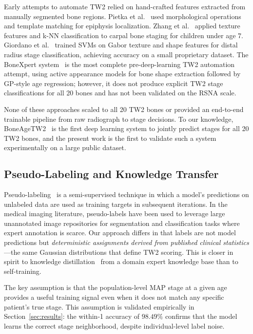 \documentclass[journal]{IEEEtran}
\begin{document}
Early attempts to automate TW2 relied on hand-crafted features
extracted from manually segmented bone regions.
Pietka et al.~\cite{pietka2001} used morphological operations and
template matching for epiphysis localization.
Zhang et al.~\cite{zhang2007} applied texture features and k-NN
classification to carpal bone staging for children under age 7.
Giordano et al.~\cite{giordano2010} trained SVMs on Gabor
texture and shape features for distal radius stage classification,
achieving accuracy on a small proprietary dataset.
The BoneXpert system~\cite{thodberg2009} is the most complete
pre-deep-learning TW2 automation attempt, using active appearance
models for bone shape extraction followed by GP-style age regression;
however, it does not produce explicit TW2 stage classifications for
all 20 bones and has not been validated on the RSNA scale.

None of these approaches scaled to all 20 TW2 bones or provided an
end-to-end trainable pipeline from raw radiograph to stage decisions.
To our knowledge, BoneAgeTW2~\cite{castillo2026boneagetw2} is the
first deep learning system to jointly predict stages for all 20 TW2
bones, and the present work is the first to validate such a system
experimentally on a large public dataset.

\subsection{Pseudo-Labeling and Knowledge Transfer}

Pseudo-labeling~\cite{lee2013} is a semi-supervised technique in
which a model's predictions on unlabeled data are used as training
targets in subsequent iterations.
In the medical imaging literature, pseudo-labels have been used
to leverage large unannotated image repositories for segmentation
and classification tasks where expert annotation is scarce.
Our approach differs in that labels are not model predictions but
\textit{deterministic assignments derived from published clinical
statistics}—the same Gaussian distributions that define TW2 scoring.
This is closer in spirit to knowledge distillation~\cite{hinton2015}
from a domain expert knowledge base than to self-training.

The key assumption is that the population-level MAP stage at a given
age provides a useful training signal even when it does not match
any specific patient's true stage.
This assumption is validated empirically in Section~\ref{sec:results}:
the within-1 accuracy of $98.49\%$ confirms that the model learns
the correct stage neighborhood, despite individual-level label noise.
\end{document}
